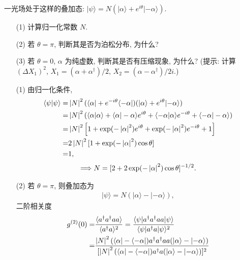 \documentclass{assignment}
\begin{document}
\begin{prob}
    一光场处于这样的叠加态: $\lvert\psi\rangle=N(\lvert\alpha\rangle+e^{i\theta}\lvert-\alpha\rangle)$.
    \begin{itemize}
        \item[(1)] 计算归一化常数 $N$.
        \item[(2)] 若 $\theta=\pi$, 判断其是否为泊松分布, 为什么?
        \item[(3)] 若 $\theta=0$, $\alpha$ 为纯虚数, 判断其是否有压缩现象, 为什么? (提示: 计算 $(\Delta X_1)^2$, $X_1=(\alpha+\alpha^{\dagger})/2$, $X_2=(\alpha-\alpha^{\dagger})/2i$.)
    \end{itemize}
\end{prob}
\begin{sol}
    \begin{itemize}
        \item[(1)] 由归一化条件,
        \begin{align}
            \notag\langle\psi\vert\psi\rangle=&\left\lvert N\right\rvert^2(\langle\alpha\rvert+e^{-i\theta}\langle-\alpha\rvert)(\lvert\alpha\rangle+e^{i\theta}\lvert-\alpha\rangle)\\
            \notag=&\left\lvert N\right\rvert^2(\langle\alpha\vert\alpha\rangle+\langle\alpha\vert-\alpha\rangle e^{i\theta}+\langle-\alpha\vert\alpha\rangle e^{-i\theta}+\langle-\alpha\vert-\alpha\rangle)\\
            \notag=&\left\lvert N\right\rvert^2\left[1+\exp(-\left\lvert\alpha\right\rvert^2)e^{i\theta}+\exp(-\left\lvert\alpha\right\rvert^2)e^{-i\theta}+1\right]\\
            \notag=&2\left\lvert N\right\rvert^2[1+\exp(-\left\lvert\alpha\right\rvert^2)\cos\theta]\\
            =&1,
        \end{align}
        \begin{align}
            \Longrightarrow N=[2+2\exp(-\left\lvert\alpha\right\rvert^2)\cos\theta]^{-1/2}.
        \end{align}
        \item[(2)] 若 $\theta=\pi$, 则叠加态为
        \begin{align}
            \lvert\psi\rangle=N(\lvert\alpha\rangle-\lvert-\alpha\rangle),
        \end{align}
        二阶相关度
        \begin{align}
            \notag g^{(2)}(0)=&\frac{\langle a^{\dagger}a^{\dagger}aa\rangle}{\langle a^{\dagger}a\rangle^2}=\frac{\langle\psi\rvert a^{\dagger}a^{\dagger}aa\lvert\psi\rangle}{\langle\psi\rvert a^{\dagger}a\lvert\psi\rangle^2}\\
            \notag=&\frac{\abs{N}^2(\langle\alpha\rvert-\langle-\alpha\rvert)a^{\dagger}a^{\dagger}aa(\lvert\alpha\rangle-\lvert-\alpha\rangle)}{[\abs{N}^2(\langle\alpha\rvert-\langle-\alpha\rvert)a^{\dagger}a(\lvert\alpha\rangle-\lvert-\alpha\rangle)]^2}\\

\end{align}
\end{itemize}
\end{sol}
\end{document}
